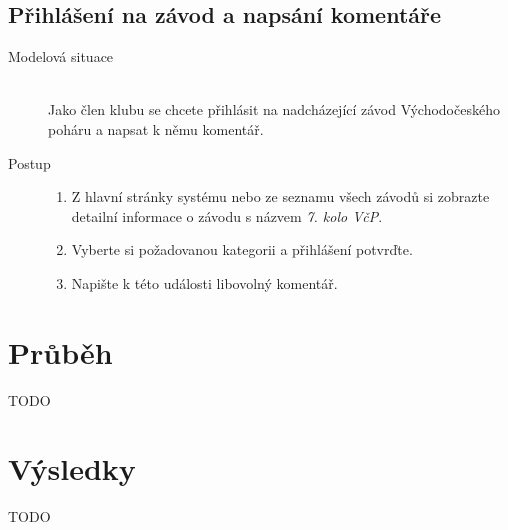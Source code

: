 \subsection{Přihlášení na závod a napsání komentáře}
\begin{description}
    \item[Modelová situace] \hfill \\
        Jako člen klubu se chcete přihlásit na nadcházející závod Východočeského poháru a napsat k němu komentář.
    \item[Postup] \hfill
        \vspace{-2mm}
        \begin{enumerate}
            \item Z hlavní stránky systému nebo ze seznamu všech závodů si zobrazte detailní informace o závodu s názvem \emph{7. kolo VčP}.
            \item Vyberte si požadovanou kategorii a přihlášení potvrďte.
            \item Napište k této události libovolný komentář.
        \end{enumerate}
\end{description}

\section{Průběh}
TODO

\section{Výsledky}
TODO
